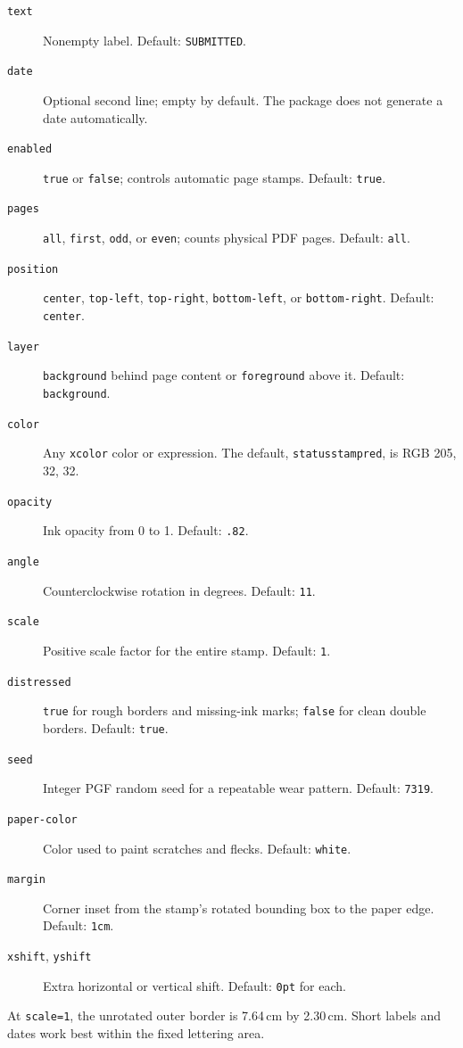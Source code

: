 \documentclass[11pt]{article}
\newcommand{\option}[1]{\texttt{#1}}
\begin{document}
\begin{description}
  \item[\option{text}] Nonempty label. Default: \texttt{SUBMITTED}.
  \item[\option{date}] Optional second line; empty by default. The package
    does not generate a date automatically.
  \item[\option{enabled}] \texttt{true} or \texttt{false}; controls automatic
    page stamps. Default: \texttt{true}.
  \item[\option{pages}] \texttt{all}, \texttt{first}, \texttt{odd}, or
    \texttt{even}; counts physical PDF pages. Default: \texttt{all}.
  \item[\option{position}] \texttt{center}, \texttt{top-left},
    \texttt{top-right}, \texttt{bottom-left}, or \texttt{bottom-right}.
    Default: \texttt{center}.
  \item[\option{layer}] \texttt{background} behind page content or
    \texttt{foreground} above it. Default: \texttt{background}.
  \item[\option{color}] Any \texttt{xcolor} color or expression. The default,
    \texttt{statusstampred}, is RGB 205, 32, 32.
  \item[\option{opacity}] Ink opacity from 0 to 1. Default: \texttt{.82}.
  \item[\option{angle}] Counterclockwise rotation in degrees. Default:
    \texttt{11}.
  \item[\option{scale}] Positive scale factor for the entire stamp. Default:
    \texttt{1}.
  \item[\option{distressed}] \texttt{true} for rough borders and missing-ink
    marks; \texttt{false} for clean double borders. Default: \texttt{true}.
  \item[\option{seed}] Integer PGF random seed for a repeatable wear pattern.
    Default: \texttt{7319}.
  \item[\option{paper-color}] Color used to paint scratches and flecks.
    Default: \texttt{white}.
  \item[\option{margin}] Corner inset from the stamp's rotated bounding box
    to the paper edge. Default: \texttt{1cm}.
  \item[\option{xshift}, \option{yshift}] Extra horizontal or vertical shift.
    Default: \texttt{0pt} for each.
\end{description}

At \verb|scale=1|, the unrotated outer border is 7.64\,cm by 2.30\,cm.
Short labels and dates work best within the fixed lettering area.
\end{document}
